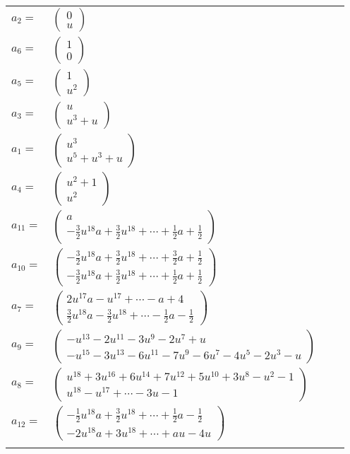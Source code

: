 \documentclass[1p]{elsarticle_modified}
\theoremstyle{definition}
\begin{document}
\begin{tabular}{m{7pt} m{180pt} m{7pt} m{180pt} }
\flushright $a_{2}=$&$\begin{pmatrix}0\\u\end{pmatrix}$ \\
\flushright $a_{6}=$&$\begin{pmatrix}1\\0\end{pmatrix}$ \\
\flushright $a_{5}=$&$\begin{pmatrix}1\\u^2\end{pmatrix}$ \\
\flushright $a_{3}=$&$\begin{pmatrix}u\\u^3+u\end{pmatrix}$ \\
\flushright $a_{1}=$&$\begin{pmatrix}u^3\\u^5+u^3+u\end{pmatrix}$ \\
\flushright $a_{4}=$&$\begin{pmatrix}u^2+1\\u^2\end{pmatrix}$ \\
\flushright $a_{11}=$&$\begin{pmatrix}a\\-\frac{3}{2} u^{18} a+\frac{3}{2} u^{18}+\cdots+\frac{1}{2} a+\frac{1}{2}\end{pmatrix}$ \\
\flushright $a_{10}=$&$\begin{pmatrix}-\frac{3}{2} u^{18} a+\frac{3}{2} u^{18}+\cdots+\frac{3}{2} a+\frac{1}{2}\\-\frac{3}{2} u^{18} a+\frac{3}{2} u^{18}+\cdots+\frac{1}{2} a+\frac{1}{2}\end{pmatrix}$ \\
\flushright $a_{7}=$&$\begin{pmatrix}2 u^{17} a- u^{17}+\cdots- a+4\\\frac{3}{2} u^{18} a-\frac{3}{2} u^{18}+\cdots-\frac{1}{2} a-\frac{1}{2}\end{pmatrix}$ \\
\flushright $a_{9}=$&$\begin{pmatrix}- u^{13}-2 u^{11}-3 u^9-2 u^7+u\\- u^{15}-3 u^{13}-6 u^{11}-7 u^9-6 u^7-4 u^5-2 u^3- u\end{pmatrix}$ \\
\flushright $a_{8}=$&$\begin{pmatrix}u^{18}+3 u^{16}+6 u^{14}+7 u^{12}+5 u^{10}+3 u^8- u^2-1\\u^{18}- u^{17}+\cdots-3 u-1\end{pmatrix}$ \\
\flushright $a_{12}=$&$\begin{pmatrix}-\frac{1}{2} u^{18} a+\frac{3}{2} u^{18}+\cdots+\frac{1}{2} a-\frac{1}{2}\\-2 u^{18} a+3 u^{18}+\cdots+a u-4 u\end{pmatrix}$\\&\end{tabular}
\end{document}
